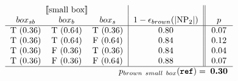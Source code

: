 \documentclass[preprint,authoryear]{elsarticle}\frenchspacing
\newcommand{\sem}[1]{\mbox{$[\![$#1$]\!]$}}
\begin{document}
\begin{equation}
\label{dispreferred-calculation}
\begin{tabular}{ccc|c||c}	
\multicolumn{3}{c|}{\sem{small box}} & & \\
$box_{sb}$ & $box_b$ & $box_s$ & $1 - \epsilon_{brown}(|\textrm{NP}_2|)$ & $p$\\ \hline
T (0.36) & T (0.64) & T (0.36) & 0.80 & 0.07 \\
T (0.36) & T (0.64) & F (0.64) & 0.84 & 0.12 \\
T (0.36) & F (0.36) & T (0.36) & 0.84 & 0.04 \\
T (0.36) & F (0.36) & F (0.64) & 0.88 & 0.07 \\ \hline
\multicolumn{4}{r}{\textbf{$p_{{brown\ small\ box}}(\texttt{ref}) = $}}\hspace{-10pt} & \textbf{0.30} \\ 
\end{tabular}
\end{equation}
\end{document}
